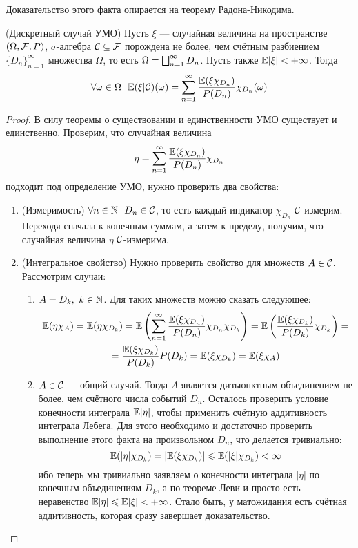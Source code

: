 \begin{note}
    Доказательство этого факта опирается на теорему Радона-Никодима.
\end{note}

\begin{lemma} (Дискретный случай УМО)
    Пусть $\xi$ --- случайная величина на пространстве $(\Omega, \mathcal{F}, P)$, $\sigma$-алгебра $\mathcal{C} \subseteq \mathcal{F}$ порождена не более, чем счётным разбиением $\{D_n\}_{n = 1}^\infty$ множества $\Omega$, то есть $\Omega = \bigsqcup_{n = 1}^{\infty} D_n$. Пусть также $\mathbb{E}|\xi| < +\infty$. Тогда
    \[
        \forall \omega \in \Omega\ \ \mathbb{E}(\xi | \mathcal{C})(\omega) = \sum_{n = 1}^{\infty} \frac{\mathbb{E}(\xi \chi_{D_n})}{P(D_n)} \chi_{D_n}(\omega)
    \]
\end{lemma}

\begin{proof}
    В силу теоремы о существовании и единственности УМО существует и единственно. Проверим, что случайная величина
    \[
        \eta = \sum_{n = 1}^{\infty} \frac{\mathbb{E}(\xi \chi_{D_n})}{P(D_n)} \chi_{D_n}
    \]
    подходит под определение УМО, нужно проверить два свойства:
    \begin{enumerate}
        \item (Измеримость) $\forall n \in \mathbb{N} \ \ D_n \in \mathcal{C}$, то есть каждый индикатор $\chi_{D_n}$ $\mathcal{C}$-измерим. Переходя сначала к конечным суммам, а затем к пределу, получим, что случайная величина $\eta$ $\mathcal{C}$-измерима.

        \item (Интегральное свойство) Нужно проверить свойство для множеств $A \in \mathcal{C}$. Рассмотрим случаи:
        \begin{enumerate}
        	\item $A = D_k,\ k \in \mathbb{N}$. Для таких множеств можно сказать следующее:
        	\begin{multline*}
        		\mathbb{E}(\eta \chi_A) = \mathbb{E}(\eta \chi_{D_k}) = \mathbb{E} \left( \sum_{n = 1}^{\infty} \frac{\mathbb{E}(\xi \chi_{D_n})}{P(D_n)} \chi_{D_n} \chi_{D_k} \right) = \mathbb{E} \left(\frac{\mathbb{E}(\xi \chi_{D_k})}{P(D_k)} \chi_{D_k} \right) =
        		\\
        		= \frac{\mathbb{E}(\xi \chi_{D_k})}{P(D_k)} P(D_k) = \mathbb{E}(\xi \chi_{D_k}) = \mathbb{E}(\xi \chi_A)
        	\end{multline*}
        	
        	\item $A \in \mathcal{C}$ --- общий случай. Тогда $A$ является дизъюнктным объединением не более, чем счётного числа событий $D_n$. Осталось проверить условие конечности интеграла $\mathbb{E}|\eta|$, чтобы применить счётную аддитивность интеграла Лебега. Для этого необходимо и достаточно проверить выполнение этого факта на произвольном $D_n$, что делается тривиально:
        	\[
        		\mathbb{E}(|\eta|\chi_{D_k}) = |\mathbb{E}(\xi\chi_{D_k})| \leqslant \mathbb{E}(|\xi|\chi_{D_k}) < \infty
        	\]
        	ибо теперь мы тривиально заявляем о конечности интеграла $|\eta|$ по конечным объединениям $D_k$, а по теореме Леви и просто есть неравенство $\mathbb{E}|\eta| \leqslant \mathbb{E}|\xi| < +\infty$. Стало быть, у матожидания есть счётная аддитивность, которая сразу завершает доказательство.
        \end{enumerate}
    \end{enumerate}
\end{proof}

